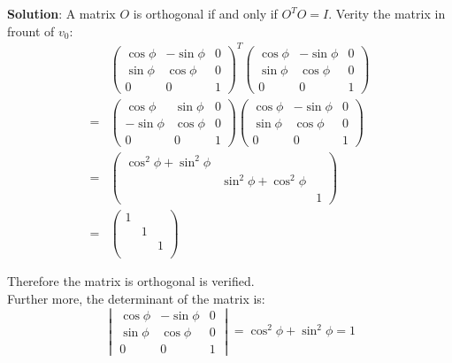 \documentclass{article}
\begin{document}
\begin{enumerate}
\begin{enumerate}
        \textbf{Solution}: A matrix $O$ is orthogonal if and only if $O^TO=I$. Verity the matrix in frount of $v_0$:
        \begin{align*}
            & 
            \begin{pmatrix} 
                \cos\phi &-\sin\phi &0 \\ 
                \sin\phi &\cos\phi &0 \\ 
                0 &0 &1 
            \end{pmatrix}^T 
            \begin{pmatrix} 
                \cos\phi &-\sin\phi &0 \\ 
                \sin\phi &\cos\phi &0 \\ 
                0 &0 &1 
            \end{pmatrix} \\
            =& 
            \begin{pmatrix} 
                \cos\phi &\sin\phi &0 \\ 
                -\sin\phi &\cos\phi &0 \\ 
                0 &0 &1 
            \end{pmatrix} 
            \begin{pmatrix} 
                \cos\phi &-\sin\phi &0 \\ 
                \sin\phi &\cos\phi &0 \\ 
                0 &0 &1 
            \end{pmatrix} \\
            =&
            \begin{pmatrix} 
                \cos^2 \phi + \sin^2\phi & & \\
                 & \sin^2 \phi + \cos^2 \phi & \\
                 & & 1
            \end{pmatrix}\\
            =& 
            \begin{pmatrix} 
                1 & & \\
                 &1 & \\
                 & &1 \\
            \end{pmatrix}
        \end{align*}
        
        Therefore the matrix is orthogonal is verified. \\
        
        Further more, the determinant of the matrix is:
        $$ \begin{vmatrix} 
                \cos\phi &-\sin\phi &0 \\ 
                \sin\phi &\cos\phi &0 \\ 
                0 &0 &1 
            \end{vmatrix}
            =\cos^2 \phi + \sin^2 \phi = 1
        $$
        

\end{enumerate}
\end{enumerate}
\end{document}
